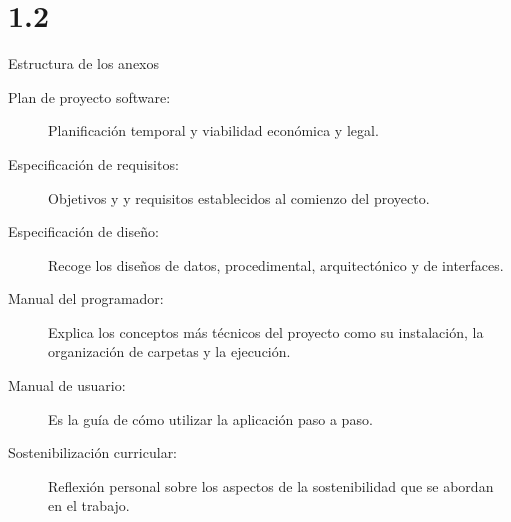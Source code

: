 \section{1.2}{Estructura de los anexos}
\begin{description}
	\item[Plan de proyecto software:] Planificación temporal y viabilidad económica y legal.
	\item[Especificación de requisitos:] Objetivos y y requisitos establecidos al comienzo del proyecto.    
    \item[Especificación de diseño:] Recoge los diseños de datos, procedimental, arquitectónico y de interfaces.
    \item[Manual del programador:] Explica los conceptos más técnicos del proyecto como su instalación, la organización de carpetas y la ejecución.
    \item[Manual de usuario:] Es la guía de cómo utilizar la aplicación paso a paso.
    \item[Sostenibilización curricular:] Reflexión personal sobre los aspectos de la sostenibilidad que se abordan en el trabajo.
    
\end{description}
